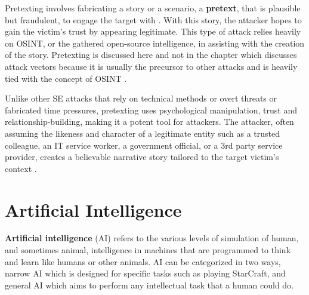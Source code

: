 Pretexting involves fabricating a story or a scenario, a \textbf{pretext}, that is plausible but fraudulent, to engage the target  with \citep{contehCybersecurityRisksVulnerabilities2016}. With this story, the attacker hopes to gain the victim's trust by appearing legitimate. This type of attack relies heavily on OSINT, or the gathered open-source intelligence, in assisting with the creation of the story. Pretexting is discussed here and not in the chapter which discusses attack vectors because it is usually the precursor to other attacks and is heavily tied with the concept of OSINT \citep{hadnagySocialEngineering2018}.

Unlike other SE attacks that rely on technical methods or overt threats or fabricated time pressures, pretexting uses psychological manipulation, trust and relationship-building, making it a potent tool for attackers. The attacker, often assuming the likeness and character of a legitimate entity such as a trusted colleague, an IT service worker, a government official, or a 3rd party service provider, creates a believable narrative story tailored to the target victim's context \citep{mitnickArtDeceptionControlling2003}.




\section{Artificial Intelligence}
\begin{comment}

Artificial Intelligence, Generative AI (ChatGPT, etc)
What to cover:
    - Mitä tekoäly oikeastaan edes on?
    - What is Generative AI
    - OpenAI releasing ChatGPT to the public in 2022
    - NLP Natural Language Processing
What to skip:
    - GPT:n historian (versiot 1, 2, 3, 3.5 jne) eli keskitytään vain GPT versioon 4 ja uudempiiin
    
\end{comment}

\textbf{Artificial intelligence} (AI) refers to the various levels of simulation of human, and sometimes animal, intelligence in machines that are programmed to think and learn like humans or other animals. AI can be categorized in two ways, narrow AI which is designed for specific tasks such as playing StarCraft, and general AI which aims to perform any intellectual task that a human could do.

